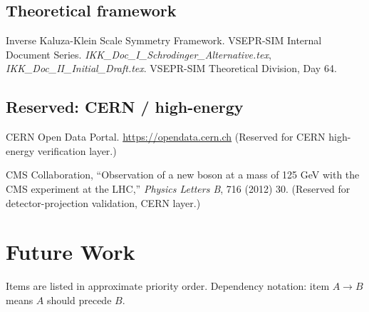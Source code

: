 \documentclass[11pt, a4paper, oneside]{article}
\begin{document}
\subsection*{Theoretical framework}

\begin{enumerate}[resume, label={[\arabic*]}, leftmargin=2.2em]

  \item Inverse Kaluza-Klein Scale Symmetry Framework.
	VSEPR-SIM Internal Document Series.
	\textit{IKK\_Doc\_I\_Schrodinger\_Alternative.tex},
	\textit{IKK\_Doc\_II\_Initial\_Draft.tex}.
	VSEPR-SIM Theoretical Division, Day 64.

\end{enumerate}

\subsection*{Reserved: CERN / high-energy}

\begin{enumerate}[resume, label={[\arabic*]}, leftmargin=2.2em]

  \item CERN Open Data Portal. \url{https://opendata.cern.ch}
	(Reserved for CERN high-energy verification layer.)

  \item CMS Collaboration, ``Observation of a new boson at a mass of
	125 GeV with the CMS experiment at the LHC,''
	\textit{Physics Letters B}, 716 (2012) 30.
	(Reserved for detector-projection validation, CERN layer.)

\end{enumerate}

\section*{Future Work}
\label{sec:futurework}

Items are listed in approximate priority order.
Dependency notation: item $A \to B$ means $A$ should precede $B$.
\end{document}

